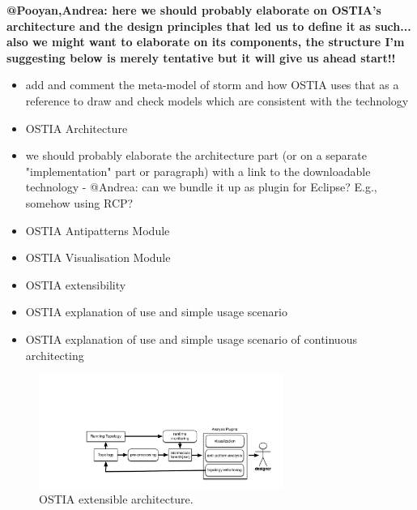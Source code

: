 \textbf{@Pooyan,Andrea: here we should probably elaborate on OSTIA's architecture and the design principles that led us to define it as such... also we might want to elaborate on its components, the structure I'm suggesting below is merely tentative but it will give us ahead start!!}

\begin{itemize}
\item add and comment the meta-model of storm and how OSTIA uses that as a reference to draw and check models which are consistent with the technology
\item OSTIA Architecture 
\item we should probably elaborate the architecture part (or on a separate "implementation" part or paragraph) with a link to the downloadable technology - @Andrea: can we bundle it up as plugin for Eclipse? E.g., somehow using RCP?
\item OSTIA Antipatterns Module
\item OSTIA Visualisation Module 
\item OSTIA extensibility
\item OSTIA explanation of use and simple usage scenario
\item OSTIA explanation of use and simple usage scenario of continuous architecting
\end{itemize}


\begin{figure}[H]
	\begin{center}
		\includegraphics[width=8cm]{images/ostia-arch}
		\caption{OSTIA extensible architecture.}
		\label{fig:ostia-arch}
	\end{center}
\end{figure}


